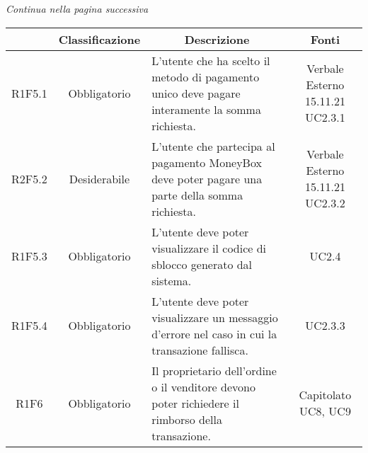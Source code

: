 \begin{center}
    \textit{\small Continua nella pagina successiva}
\end{center}
\begin{table}[H]
    \centering
    \renewcommand{\arraystretch}{1.8}
    \begin{tabular}{c | c | p{6cm} | c}
        \rowcolor[HTML]{125E28}
        \multicolumn{1}{c}{\color[HTML]{FFFFFF} \textbf{Codice}}          &
        \multicolumn{1}{c}{\color[HTML]{FFFFFF} \textbf{Classificazione}} &
        \multicolumn{1}{c}{\color[HTML]{FFFFFF} \textbf{Descrizione}}     &
        \multicolumn{1}{c}{\color[HTML]{FFFFFF} \textbf{Fonti}}                                                                                                                                                                                          \\
        \hline
        R1F5.1                                                            & Obbligatorio & L'utente che ha scelto il metodo di pagamento unico deve pagare interamente la somma richiesta.                       & \Shortunderstack{Verbale Esterno 15.11.21\\UC2.3.1\\}      \\
        R2F5.2                                                            & Desiderabile & L'utente che partecipa al pagamento MoneyBox\glo{} deve poter pagare una parte della somma richiesta.                 & \Shortunderstack{Verbale Esterno 15.11.21\\UC2.3.2\\}      \\
        R1F5.3                                                            & Obbligatorio & L'utente deve poter visualizzare il codice di sblocco generato dal sistema.                                           & UC2.4                                 \\
        R1F5.4                                                            & Obbligatorio & L'utente deve poter visualizzare un messaggio d'errore nel caso in cui la transazione fallisca.                       & UC2.3.3                               \\
        R1F6                                                              & Obbligatorio & Il proprietario dell'ordine o il venditore devono poter richiedere il rimborso della transazione.                     & \Shortunderstack{Capitolato\\UC8, UC9\\}   \\

\end{tabular}
\end{table}
